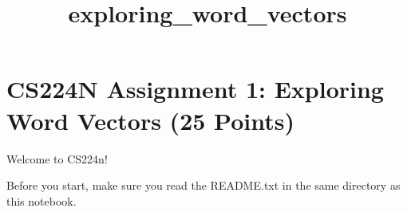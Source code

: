 \documentclass[11pt]{article}
\title{exploring\_word\_vectors}
\begin{document}
    
    
    \maketitle
    
    

    
    \hypertarget{cs224n-assignment-1-exploring-word-vectors-25-points}{%
\section{CS224N Assignment 1: Exploring Word Vectors (25
Points)}\label{cs224n-assignment-1-exploring-word-vectors-25-points}}

Welcome to CS224n!

Before you start, make sure you read the README.txt in the same
directory as this notebook.
\end{document}
